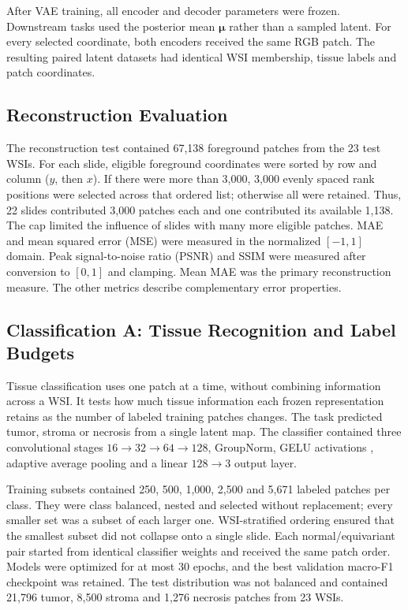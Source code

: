 \documentclass[conference,a4paper]{IEEEtran}
\begin{document}
After VAE training, all encoder and decoder parameters were frozen. Downstream
tasks used the posterior mean $\boldsymbol{\mu}$ rather than a sampled latent.
For every selected coordinate, both encoders received the same RGB patch. The
resulting paired latent datasets had identical WSI membership, tissue labels
and patch coordinates.

\subsection{Reconstruction Evaluation}

The reconstruction test contained 67,138 foreground patches from the 23 test
WSIs. For each slide, eligible foreground coordinates were sorted by row and
column ($y$, then $x$). If there were more than 3,000, 3,000 evenly spaced
rank positions were selected across that ordered list; otherwise all were
retained. Thus, 22 slides contributed 3,000 patches each and one contributed
its available 1,138. The cap limited the influence of slides with many more
eligible patches.
MAE and mean squared error (MSE) were measured in the normalized $[-1,1]$
domain. Peak signal-to-noise ratio (PSNR) and SSIM were measured after
conversion to $[0,1]$ and clamping. Mean MAE was the primary reconstruction
measure. The other metrics describe complementary error properties.

\subsection{Classification A: Tissue Recognition and Label Budgets}

Tissue classification uses one patch at a time, without combining
information across a WSI. It tests how much tissue information each frozen
representation retains as the number of labeled training patches changes.
The task predicted tumor, stroma or necrosis from a single latent map. The classifier contained three convolutional stages
$16\rightarrow32\rightarrow64\rightarrow128$, GroupNorm, GELU activations
\cite{hendrycks_gelu_2016}, adaptive average pooling and a linear
$128\rightarrow3$ output layer.

Training subsets contained 250, 500, 1,000, 2,500 and 5,671 labeled patches
per class. They were class balanced, nested and selected without replacement;
every smaller set was a subset of each larger one. WSI-stratified ordering
ensured that the smallest subset did not collapse onto a single slide. Each
normal/equivariant pair started from identical classifier weights and received
the same patch order. Models were optimized for at most 30 epochs, and the
best validation macro-F1 checkpoint was retained. The test distribution was
not balanced and contained 21,796 tumor, 8,500 stroma and 1,276 necrosis
patches from 23 WSIs.
\end{document}
